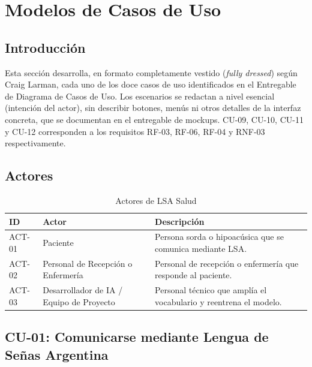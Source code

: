\section{Modelos de Casos de Uso}

\subsection{Introducción}

Esta sección desarrolla, en formato completamente vestido (\textit{fully
dressed}) según Craig Larman, cada uno de los doce casos de uso
identificados en el Entregable de Diagrama de Casos de Uso. Los escenarios
se redactan a nivel esencial (intención del actor), sin describir botones,
menús ni otros detalles de la interfaz concreta, que se documentan en el
entregable de mockups. CU-09, CU-10, CU-11 y CU-12 corresponden a los
requisitos RF-03, RF-06, RF-04 y RNF-03 respectivamente.

\subsection{Actores}

\begin{table}[H]
    \centering
    \caption{Actores de LSA Salud}
    \label{tab:actores-mcu}
    \begin{tabularx}{\textwidth}{l l X}
        \toprule
        \textbf{ID} & \textbf{Actor} & \textbf{Descripción} \\
        \midrule
        ACT-01 & Paciente & Persona sorda o hipoacúsica que se comunica mediante LSA. \\
        ACT-02 & Personal de Recepción o Enfermería & Personal de recepción o enfermería que responde al paciente. \\
        ACT-03 & Desarrollador de IA / Equipo de Proyecto & Personal técnico que amplía el vocabulario y reentrena el modelo. \\
        \bottomrule
    \end{tabularx}
\end{table}

\subsection{CU-01: Comunicarse mediante Lengua de Señas Argentina}

